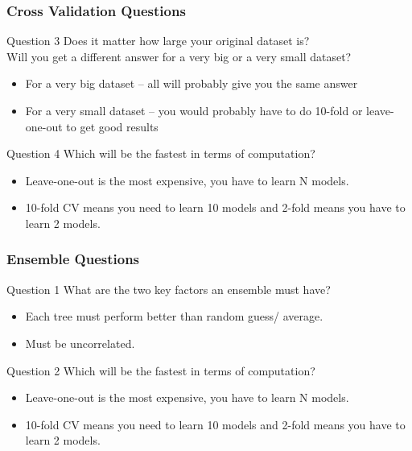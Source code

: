 \documentclass[aspectratio=169, 10pt]{beamer}
\begin{document}
\begin{frame}
    \frametitle{Cross Validation Questions}
    \begin{block}{Question 3}
        Does it matter how large your original dataset is?\\
        Will you get a different answer for a very big or a very small dataset?
    \end{block}

    \begin{itemize}
        \item For a very big dataset – all will probably give you the same answer
        \item For a very small dataset – you would probably have to do 10-fold or leave-one-out to get good results
    \end{itemize}

    \begin{block}{Question 4}
        Which will be the fastest in terms of computation?
    \end{block}

    \begin{itemize}
        \item Leave-one-out is the most expensive, you have to learn N models.
        \item 10-fold CV means you need to learn 10 models and 2-fold means you have to learn 2 models.
    \end{itemize}

\end{frame}

\begin{frame}
    \frametitle{Ensemble Questions}
    \begin{block}{Question 1}
        What are the two key factors an ensemble must have?
    \end{block}

    \begin{itemize}
        \item Each tree must perform better than random guess/ average.
        \item Must be uncorrelated.
    \end{itemize}

    \begin{block}{Question 2}
        Which will be the fastest in terms of computation?
    \end{block}

    \begin{itemize}
        \item Leave-one-out is the most expensive, you have to learn N models.
        \item 10-fold CV means you need to learn 10 models and 2-fold means you have to learn 2 models.
    \end{itemize}

\end{frame}
\end{document}
